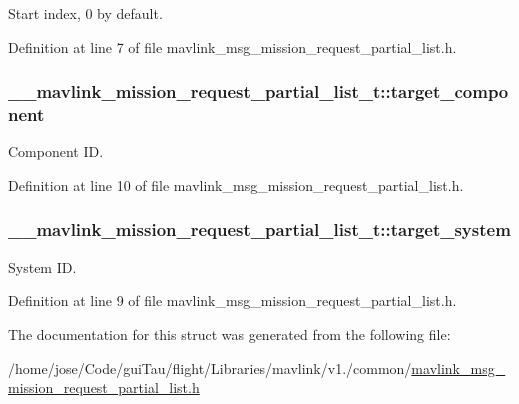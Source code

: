 Start index, 0 by default. 



Definition at line 7 of file mavlink\-\_\-msg\-\_\-mission\-\_\-request\-\_\-partial\-\_\-list.\-h.

\hypertarget{struct____mavlink__mission__request__partial__list__t_abc11feeb766eb42c7eadff5850284cd2}{
\subsubsection[{target\-\_\-component}]{ \-\_\-\-\_\-mavlink\-\_\-mission\-\_\-request\-\_\-partial\-\_\-list\-\_\-t\-::target\-\_\-component}}\label{struct____mavlink__mission__request__partial__list__t_abc11feeb766eb42c7eadff5850284cd2}


Component I\-D. 



Definition at line 10 of file mavlink\-\_\-msg\-\_\-mission\-\_\-request\-\_\-partial\-\_\-list.\-h.

\hypertarget{struct____mavlink__mission__request__partial__list__t_aa4ec7ce5b44a621b414861aa5e575cc6}{
\subsubsection[{target\-\_\-system}]{ \-\_\-\-\_\-mavlink\-\_\-mission\-\_\-request\-\_\-partial\-\_\-list\-\_\-t\-::target\-\_\-system}}\label{struct____mavlink__mission__request__partial__list__t_aa4ec7ce5b44a621b414861aa5e575cc6}


System I\-D. 



Definition at line 9 of file mavlink\-\_\-msg\-\_\-mission\-\_\-request\-\_\-partial\-\_\-list.\-h.



The documentation for this struct was generated from the following file\-:\begin{DoxyCompactItemize}
\item 
/home/jose/\-Code/gui\-Tau/flight/\-Libraries/mavlink/v1./common/\hyperlink{mavlink__msg__mission__request__partial__list_8h}{mavlink\-\_\-msg\-\_\-mission\-\_\-request\-\_\-partial\-\_\-list.\-h}\end{DoxyCompactItemize}
